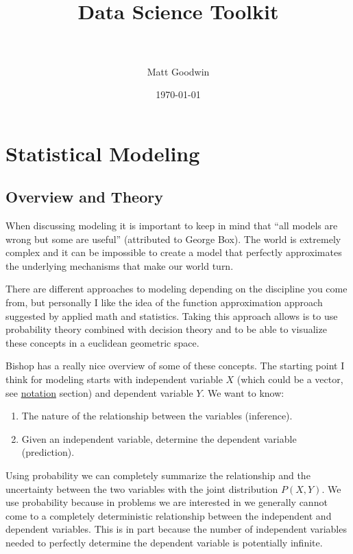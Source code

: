 \documentclass[paper=a4, fontsize=11pt]{scrartcl} %
\title{	
\normalfont \normalsize 
\horrule{0.5pt} \\[0.4cm] %
\huge Data Science Toolkit \\ %
\horrule{2pt} \\[0.5cm] %
}
\author{Matt Goodwin} %
\date{\normalsize\today} %
\numberwithin{equation}{section} %
\numberwithin{figure}{section} %
\numberwithin{table}{section} %
\begin{document}
\maketitle 

\tableofcontents
\newpage


\section{Statistical Modeling}
\subsection{Overview and Theory}

When discussing modeling it is important to keep in mind that ``all models are wrong but some are useful'' (attributed to George Box). The world is extremely complex and it can be impossible to create a model that perfectly approximates the underlying mechanisms that make our world turn.

There are different approaches to modeling depending on the discipline you come from, but personally I like the idea of the function approximation approach suggested by applied math and statistics. Taking this approach allows is to use probability theory combined with decision theory and to be able to visualize these concepts in a euclidean geometric space.

Bishop has a really nice overview of some of these concepts. The starting point I think for modeling starts with independent variable $X$ (which could be a vector, see \hyperref[sec:notation]{notation} section) and dependent variable $Y$. We want to know:

\begin{enumerate}
\item The nature of the relationship between the variables (inference). 
\item Given an independent variable, determine the dependent variable (prediction).
\end{enumerate}

Using probability we can completely summarize the relationship and the uncertainty between the two variables with the joint distribution $P(X,Y)$. We use probability because in problems we are interested in we generally cannot come to a completely deterministic relationship between the independent and dependent variables. This is in part because the number of independent variables needed to perfectly determine the dependent variable is potentially infinite. 
\end{document}
